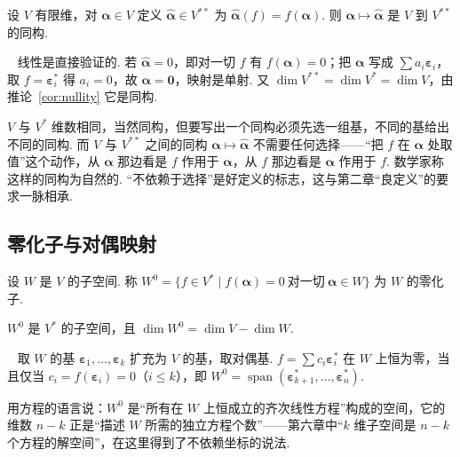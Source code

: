 \documentclass[lang=cn,10.5pt,scheme=chinese,toc=twocol,section,chinesefont=nofont,
twoside,citestyle=gb7714-2015,bibstyle=gb7714-2015]{elegantbook}
\DeclareRobustCommand{\textbf}[1]{{\lnsemiboldlatin\lnsemiboldcjk #1}}
\newcommand{\vv}[1]{\boldsymbol{#1}}
\newcommand{\zero}{\boldsymbol{0}}          %
\numberwithin{equation}{section}   %
\newcommand{\spn}{\operatorname{span}}      %
\newcommand*{\lnlabel}[1]{{\sffamily\bfseries\color{black}#1}}
\renewenvironment{proof}{%
	\par\noindent\lnlabel{\proofname}\;\ \color{black!90}\cfs}{\par}
\begin{document}
\begin{proposition}
  设 $V$ 有限维，对 $\vv\alpha\in V$ 定义 $\hat{\vv\alpha}\in V^{**}$ 为 $\hat{\vv\alpha}(f)=f(\vv\alpha)$. 则 $\vv\alpha\mapsto\hat{\vv\alpha}$ 是 $V$ 到 $V^{**}$ 的同构.
\end{proposition}
\begin{proof}
  线性是直接验证的. 若 $\hat{\vv\alpha}=0$，即对一切 $f$ 有 $f(\vv\alpha)=0$；把 $\vv\alpha$ 写成 $\sum a_i\vv\varepsilon_i$，取 $f=\vv\varepsilon_i^*$ 得 $a_i=0$，故 $\vv\alpha=\zero$，映射是单射. 又 $\dim V^{**}=\dim V^*=\dim V$，由推论~\ref{cor:nullity} 它是同构.
\end{proof}

\begin{motivebox}
  $V$ 与 $V^*$ 维数相同，当然同构，但要写出一个同构必须先\textbf{选一组基}，不同的基给出不同的同构. 而 $V$ 与 $V^{**}$ 之间的同构 $\vv\alpha\mapsto\hat{\vv\alpha}$ 不需要任何选择——“把 $f$ 在 $\vv\alpha$ 处取值”这个动作，从 $\vv\alpha$ 那边看是 $f$ 作用于 $\vv\alpha$，从 $f$ 那边看是 $\vv\alpha$ 作用于 $f$. 数学家称这样的同构为\textbf{自然的}. “不依赖于选择”是好定义的标志，这与第二章“良定义”的要求一脉相承.
\end{motivebox}

\subsection{零化子与对偶映射}

\begin{definition}
  设 $W$ 是 $V$ 的子空间. 称 $W^0=\{f\in V^*\mid f(\vv\alpha)=0\ \text{对一切}\ \vv\alpha\in W\}$ 为 $W$ 的\textbf{零化子}.
\end{definition}

\begin{proposition}
  \label{prop:annihilator}
  $W^0$ 是 $V^*$ 的子空间，且 $\dim W^0=\dim V-\dim W$.
\end{proposition}
\begin{proof}
  取 $W$ 的基 $\vv\varepsilon_1,\ldots,\vv\varepsilon_k$ 扩充为 $V$ 的基，取对偶基. $f=\sum c_i\vv\varepsilon_i^*$ 在 $W$ 上恒为零，当且仅当 $c_i=f(\vv\varepsilon_i)=0$（$i\le k$），即 $W^0=\spn(\vv\varepsilon_{k+1}^*,\ldots,\vv\varepsilon_n^*)$.
\end{proof}

用方程的语言说：$W^0$ 是“所有在 $W$ 上恒成立的齐次线性方程”构成的空间，它的维数 $n-k$ 正是“描述 $W$ 所需的独立方程个数”——第六章中“$k$ 维子空间是 $n-k$ 个方程的解空间”，在这里得到了不依赖坐标的说法.
\end{document}

